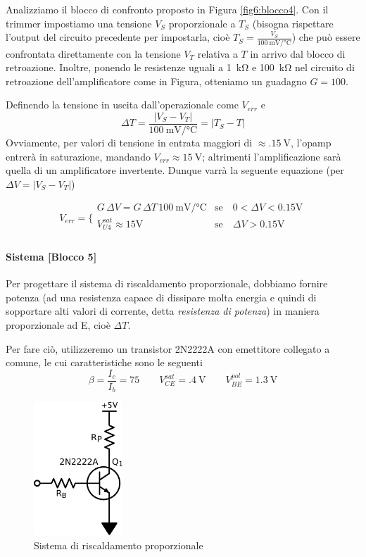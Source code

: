 Analizziamo il blocco di confronto proposto in Figura \ref{fig6:blocco4}.
Con il trimmer impostiamo una tensione $V_{S}$ proporzionale a $T_{S}$ (bisogna rispettare l'output del circuito precedente per impostarla, cioè $T_S = \frac{V_S}{\SI{100}{\milli\volt\per\celsius}}$) che può essere confrontata direttamente con la tensione $V_{T}$ relativa a $T$ in arrivo dal blocco di retroazione.
Inoltre, ponendo le resistenze uguali a \SI{1}{\kilo\ohm} e \SI{100}{\kilo\ohm} nel circuito di retroazione dell'amplificatore come in Figura, otteniamo un guadagno $G=100$.

Definendo la tensione in uscita dall'operazionale come $V_{err}$ e
$$\Delta T = \frac{|V_{S}-V_{T}|}{\SI{100}{\milli\volt}/\si{\celsius}}= | T_S - T | $$
Ovviamente, per valori di tensione in entrata maggiori di $\approx \SI{.15}{\volt}$, l'opamp entrerà in saturazione, mandando $V_{err}\approx \SI{15}{\volt}$; altrimenti l'amplificazione sarà quella di un amplificatore invertente.
Dunque varrà la seguente equazione (per $\Delta V = |V_S - V_T|$)

\begin{equation}
V_{err} = \bigg \{
\begin{array}{rl}
G \,\Delta V = G \,\Delta T \,\SI{100}{\milli\volt}/\si{\celsius}  & \mathrm{se} \quad 0<\Delta V<0.15 \si{\volt} \\
V_{U4}^{sat}\approx 15 \si{\volt} & \mathrm{se} \quad \Delta V>0.15 \si{\volt} \\
\end{array}
\label{eq6:exit_opamp}
\end{equation}

\paragraph{Sistema [Blocco 5]\newline}

Per progettare il sistema di riscaldamento proporzionale, dobbiamo fornire potenza (ad una resistenza capace di dissipare molta energia e quindi di sopportare alti valori di corrente, detta \textit{resistenza di potenza}) in maniera proporzionale ad E, cioè $\Delta T$.

Per fare ciò, utilizzeremo un transistor 2N2222A con emettitore collegato a comune, le cui caratteristiche sono le seguenti
$$\beta=\frac{I_c}{I_b}=75 \qquad V_{CE}^{sat}=\SI{.4}{\volt} \qquad V_{BE}^{pol}=\SI{1.3}{\volt}$$

\begin{figure}
\centering
\includegraphics[height=5cm]{../E06/latex/P5.pdf}
\caption{Sistema di riscaldamento proporzionale}
\label{fig6:sistema}
\end{figure}

